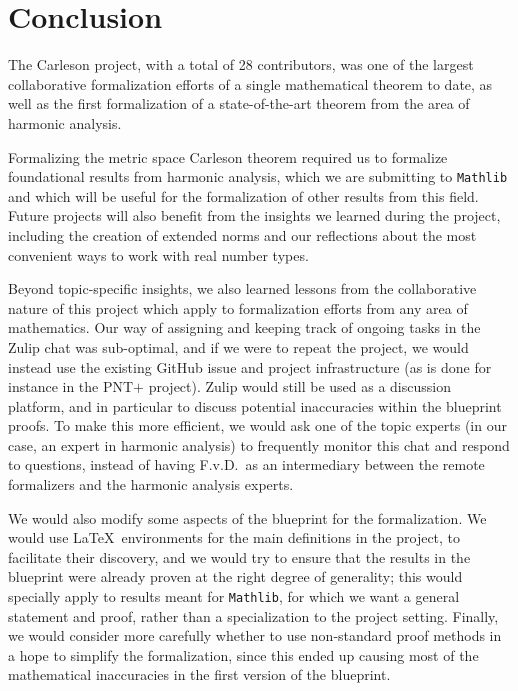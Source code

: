 \documentclass[12pt]{amsart}
\newcommand{\mathlib}{\texttt{Mathlib}\xspace}
\theoremstyle{definition}
\theoremstyle{plain}
\begin{document}
\section{Conclusion}\label{sec:conclusion}

The Carleson project, with a total of 28 contributors,
was one of the largest collaborative formalization efforts of a single mathematical theorem to date,
as well as the first formalization of a state-of-the-art theorem
from the area of harmonic analysis.

Formalizing the metric space Carleson theorem required us
to formalize foundational results from harmonic analysis,
which we are submitting to \mathlib
and which will be useful for the formalization of other results from this field.
Future projects will also benefit from the insights we learned during the project,
including the creation of extended norms
and our reflections about the most convenient ways to work with real number types.

Beyond topic-specific insights,
we also learned lessons from the collaborative nature of this project
which apply to formalization efforts from any area of mathematics.
Our way of assigning and keeping track of ongoing tasks in the Zulip chat was sub-optimal,
and if we were to repeat the project,
we would instead use the existing GitHub issue and project infrastructure (as is done for instance in the PNT$+$ project).
Zulip would still be used as a discussion platform,
and in particular to discuss potential inaccuracies within the blueprint proofs.
To make this more efficient, we would ask one of the topic experts
(in our case, an expert in harmonic analysis)
to frequently monitor this chat and respond to questions,
instead of having F.v.D.\ as an intermediary between the remote formalizers and the harmonic analysis experts.

We would also modify some aspects of the blueprint for the formalization.
We would use \LaTeX\ environments for the main definitions in the project,
to facilitate their discovery,
and we would try to ensure that the results in the blueprint were already proven at the right degree of generality;
this would specially apply to results meant for \mathlib, for which we want a general statement and proof,
rather than a specialization to the project setting.
Finally, we would consider more carefully whether to use non-standard proof methods in a hope to simplify the formalization,
since this ended up causing most of the mathematical inaccuracies in the first version of the blueprint.
\end{document}
